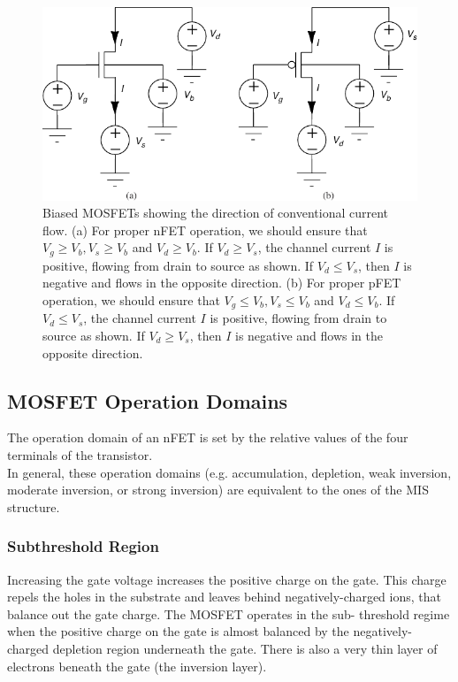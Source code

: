 \documentclass[main]{subfiles}
\begin{document}
\begin{figure}[H]
\includegraphics[width=0.8\linewidth]{figs/nFET-pFET-operation.pdf}
\caption{Biased MOSFETs showing the direction of conventional current flow. (a) For proper nFET operation, we should ensure that $V_g \geq V_b, V_s \geq V_b $ and $V_d \geq V_b$. If $V_d \geq V_s$, the channel current $I$ is positive, flowing from drain to source as shown. If $V_d \leq V_s$, then $I$ is negative and flows in the opposite direction. (b) For proper pFET operation, we should ensure that $V_g \leq V_b, V_s \leq V_b $ and $V_d \leq V_b$. If $V_d \leq V_s$, the channel current $I$ is positive, flowing from drain to source as shown. If $V_d \geq V_s$, then $I$ is negative and flows in the opposite direction.}
\end{figure}


\subsection{MOSFET Operation Domains}
The operation domain of an nFET is set by the relative values of the four terminals of the transistor.\\
In general, these operation domains (e.g. accumulation, depletion, weak inversion, moderate inversion, or strong inversion) are equivalent to the ones of the MIS structure.\\

\subsubsection{Subthreshold Region}
Increasing the gate voltage increases the positive charge on the gate. This
charge repels the holes in the substrate and leaves behind negatively-charged
ions, that balance out the gate charge. The MOSFET operates in the sub-
threshold regime when the positive charge on the gate is almost balanced by
the negatively-charged depletion region underneath the gate.
There is also a very thin layer of electrons beneath the gate (the inversion
layer).
\end{document}
